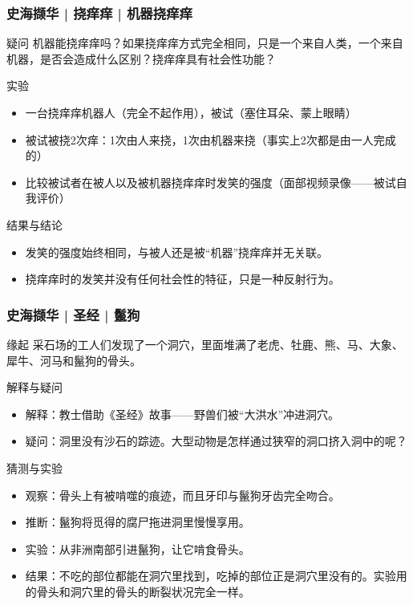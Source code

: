 \begin{frame}
  \frametitle{史海撷华 | 挠痒痒 | 机器挠痒痒}
  \begin{block}{疑问}
    机器能挠痒痒吗？如果挠痒痒方式完全相同，只是一个来自人类，一个来自机器，是否会造成什么区别？挠痒痒具有社会性功能？
  \end{block}
  \pause
  \begin{block}{实验}
    \begin{itemize}
      \item 一台挠痒痒机器人（完全不起作用），被试（塞住耳朵、蒙上眼睛）
      \item 被试被挠2次痒：1次由人来挠，1次由机器来挠（事实上2次都是由一人完成的）
      \item 比较被试者在被人以及被机器挠痒痒时发笑的强度（面部视频录像——被试自我评价）
    \end{itemize}
  \end{block}
  \pause
  \begin{block}{结果与结论}
    \begin{itemize}
      \item 发笑的强度始终相同，与被人还是被“机器”挠痒痒并无关联。
      \item 挠痒痒时的发笑并没有任何社会性的特征，只是一种反射行为。
    \end{itemize}
  \end{block}
\end{frame}

\begin{frame}
  \frametitle{史海撷华 | 圣经 | 鬣狗}
  \begin{block}{缘起}
采石场的工人们发现了一个洞穴，里面堆满了老虎、牡鹿、熊、马、大象、犀牛、河马和鬣狗的骨头。
  \end{block}
  \vspace{-0.5em}
  \pause
  \begin{block}{解释与疑问}
    \begin{itemize}
      \item 解释：教士借助《圣经》故事——野兽们被“大洪水”冲进洞穴。
      \item 疑问：洞里没有沙石的踪迹。大型动物是怎样通过狭窄的洞口挤入洞中的呢？
    \end{itemize}
  \end{block}
  \vspace{-0.5em}
  \pause
  \begin{block}{猜测与实验}
    \begin{itemize}
      \item 观察：骨头上有被啃噬的痕迹，而且牙印与鬣狗牙齿完全吻合。
      \item 推断：鬣狗将觅得的腐尸拖进洞里慢慢享用。
      \item 实验：从非洲南部引进鬣狗，让它啃食骨头。
      \item 结果：不吃的部位都能在洞穴里找到，吃掉的部位正是洞穴里没有的。实验用的骨头和洞穴里的骨头的断裂状况完全一样。
    \end{itemize}
  \end{block}
\end{frame}

